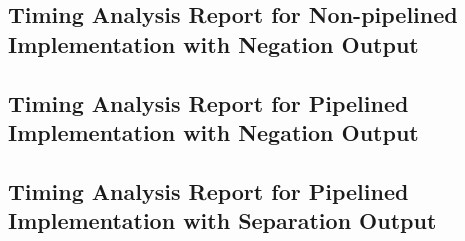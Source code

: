 \subsection{Timing Analysis Report for Non-pipelined Implementation with Negation Output}
\label{sec:ap_7}

{
	\footnotesize{
		
	}
}

\subsection{Timing Analysis Report for Pipelined Implementation with Negation Output}
\label{sec:ap_8}

{
	\footnotesize{
		
	}
}

\subsection{Timing Analysis Report for Pipelined Implementation with Separation Output}
\label{sec:ap_9}

{
	\footnotesize{
		
	}
}